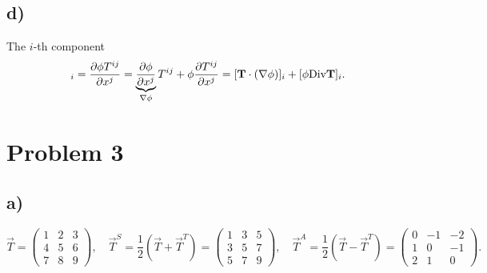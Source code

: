 \documentclass[10pt]{article}
\begin{document}
    \subsection*{d)}
    The $i$-th component
    \begin{align*}
      [\tm{Div}(\phi \vec T)]_i = \ptf{\phi T^{ij}}{x^j} = \underbrace{\ptf{\phi}{x^j}}_{\nabla \phi} T^{ij} + \phi \ptf{T^{ij}}{x^j} 
      = [\vec T \cdot (\nabla \phi)]_i + [\phi \tm{Div}{\vec T}]_i.
    \end{align*}

    \section{Problem 3}
    \subsection*{a)}
    \begin{displaymath}
      \vec T = \begin{pmatrix}
        1 & 2 & 3\\
        4 & 5 & 6 \\
        7 & 8 & 9
      \end{pmatrix}, \quad 
      \vec T^S = \frac{1}{2}(\vec T + \vec T^T) = 
      \begin{pmatrix}
        1 & 3 & 5 \\
        3 & 5 & 7 \\
        5 & 7 & 9
      \end{pmatrix}, \quad 
      \vec T^A = \frac{1}{2}(\vec T - \vec T^T) = 
      \begin{pmatrix}
        0 & -1 & -2 \\
        1 & 0 & -1 \\
        2 & 1 & 0
      \end{pmatrix}.
    \end{displaymath}
\end{document}
